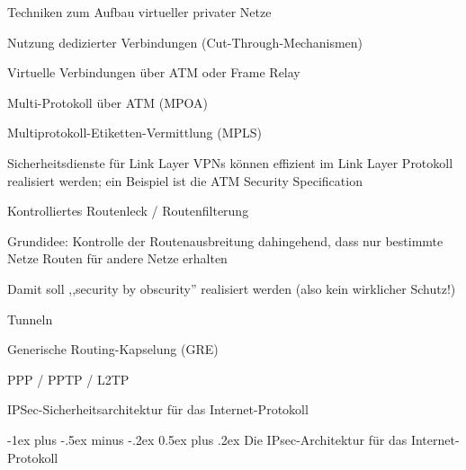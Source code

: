 \documentclass[a4paper]{article}
\makeatletter
\renewcommand{\section}{\@startsection{section}{1}{0mm}%
 {-1ex plus -.5ex minus -.2ex}%
 {0.5ex plus .2ex}%
 {\normalfont\large\bfseries}}
\makeatother
\begin{document}
\begin{multicols}{3}
      Techniken zum Aufbau virtueller privater Netze
      \begin{itemize*}
            \item Nutzung dedizierter Verbindungen (Cut-Through-Mechanismen)
            \begin{itemize*}
                  \item Virtuelle Verbindungen über ATM oder Frame Relay
                  \item Multi-Protokoll über ATM (MPOA)
                  \item Multiprotokoll-Etiketten-Vermittlung (MPLS)
                  \item Sicherheitsdienste für Link Layer VPNs können effizient im Link Layer Protokoll realisiert werden; ein Beispiel ist die ATM Security Specification
            \end{itemize*}
            \item Kontrolliertes Routenleck / Routenfilterung
            \begin{itemize*}
                  \item Grundidee: Kontrolle der Routenausbreitung dahingehend, dass nur bestimmte Netze Routen für andere Netze erhalten
                  \item Damit soll ,,security by obscurity'' realisiert werden (also kein wirklicher Schutz!)
            \end{itemize*}
            \item Tunneln
            \begin{itemize*}
                  \item Generische Routing-Kapselung (GRE)
                  \item PPP / PPTP / L2TP
                  \item IPSec-Sicherheitsarchitektur für das Internet-Protokoll
            \end{itemize*}
      \end{itemize*}

      \section{Die IPsec-Architektur für das Internet-Protokoll}

\end{multicols}
\end{document}
